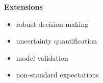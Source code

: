 \begin{frame}

\textbf{Extensions}\vspace{0.5cm}
\begin{itemize}\setlength\itemsep{1em}
\item robust decision-making
\item uncertainty quantification
\item model validation
\item non-standard expectations
\end{itemize}
\end{frame}

